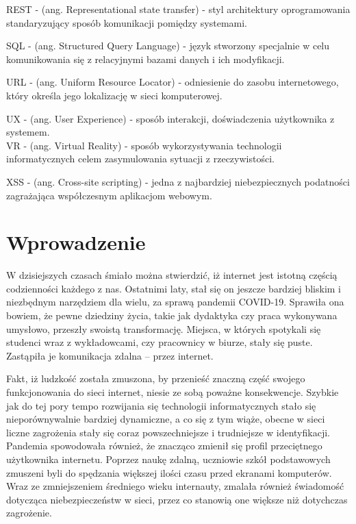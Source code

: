 \documentclass[12pt,twoside]{article}
\begin{document}
REST - (ang. Representational state transfer) - styl architektury oprogramowania standaryzujący sposób komunikacji pomiędzy systemami.

SQL - (ang. Structured Query Language) - język stworzony specjalnie w celu komunikowania się z relacyjnymi bazami danych i ich modyfikacji.

URL - (ang. Uniform Resource Locator) - odniesienie do zasobu internetowego, który określa jego lokalizację w sieci komputerowej.

UX - (ang. User Experience) - sposób interakcji, doświadczenia użytkownika z systemem.\\

VR - (ang. Virtual Reality) - sposób wykorzystywania technologii informatycznych celem zasymulowania sytuacji z rzeczywistości.

XSS - (ang. Cross-site scripting) - jedna z najbardziej niebezpiecznych podatności zagrażająca współczesnym aplikacjom webowym. 

\clearpage
\section{Wprowadzenie}

W dzisiejszych czasach śmiało można stwierdzić, iż	internet jest istotną częścią codzienności każdego z nas. Ostatnimi laty, stał się on jeszcze bardziej bliskim i niezbędnym narzędziem dla wielu, za sprawą pandemii COVID-19. Sprawiła ona bowiem, że pewne dziedziny życia, takie jak dydaktyka czy praca wykonywana umysłowo, przeszły swoistą transformację. Miejsca, w których spotykali się studenci wraz z wykładowcami, czy pracownicy w biurze, stały się puste. Zastąpiła je komunikacja zdalna -- przez internet. 

Fakt, iż ludzkość została zmuszona, by przenieść znaczną część swojego funkcjonowania do sieci internet, niesie ze sobą poważne konsekwencje. Szybkie jak do tej pory tempo rozwijania się technologii informatycznych stało się nieporównywalnie bardziej dynamiczne, a co się z tym wiąże, obecne w sieci liczne zagrożenia stały się coraz powszechniejsze i trudniejsze w identyfikacji. Pandemia spowodowała również, że znacząco zmienił się profil przeciętnego użytkownika internetu. Poprzez naukę zdalną, uczniowie szkół podstawowych zmuszeni byli do spędzania większej ilości czasu przed ekranami komputerów. Wraz ze zmniejszeniem średniego wieku internauty, zmalała również świadomość dotycząca niebezpieczeństw w sieci, przez co stanowią one większe niż dotychczas zagrożenie. 
\end{document}
